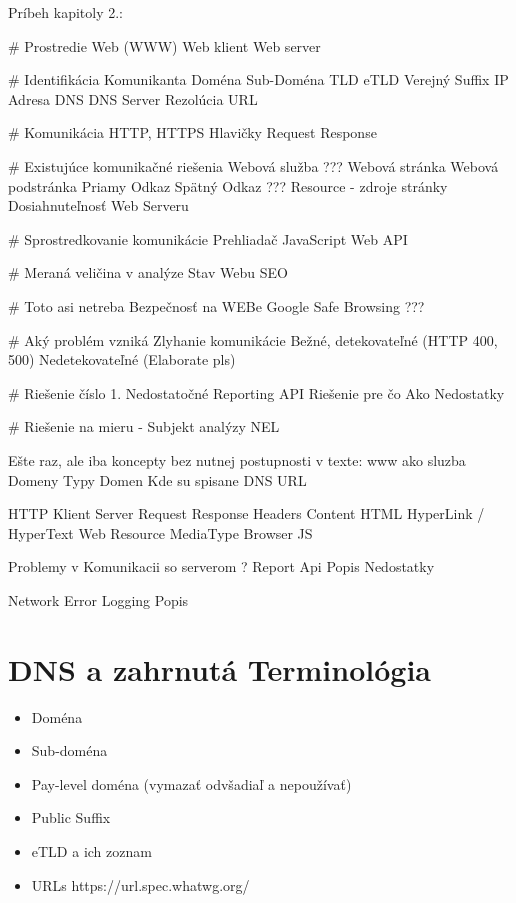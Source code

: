 Príbeh kapitoly 2.:

\# Prostredie
Web (WWW)
Web klient
Web server

\# Identifikácia Komunikanta
Doména
    Sub-Doména
TLD
eTLD
Verejný Suffix
IP Adresa
DNS
    DNS Server
    Rezolúcia
URL

\# Komunikácia
HTTP, HTTPS
Hlavičky
Request
Response

\# Existujúce komunikačné riešenia
Webová služba ???
Webová stránka
    Webová podstránka
    Priamy Odkaz
    Spätný Odkaz ???
    Resource - zdroje stránky
Dosiahnuteľnosť Web Serveru

\# Sprostredkovanie komunikácie
Prehliadač
    JavaScript
    Web API

\# Meraná veličina v analýze
Stav Webu
    SEO

\# Toto asi netreba
Bezpečnosť na WEBe
    Google Safe Browsing ???

\# Aký problém vzniká
Zlyhanie komunikácie
    Bežné, detekovateľné (HTTP 400, 500)
    Nedetekovateľné (Elaborate pls)

\# Riešenie číslo 1. Nedostatočné
Reporting API
    Riešenie pre čo 
    Ako
    Nedostatky

\# Riešenie na mieru - Subjekt analýzy    
NEL




Ešte raz, ale iba koncepty bez nutnej postupnosti v texte: 
www ako sluzba
    Domeny
        Typy Domen
        Kde su spisane
        DNS
        URL
    
HTTP
    Klient Server
    Request
    Response
    Headers
    Content
        HTML
        HyperLink / HyperText
        Web Resource
        MediaType
    Browser
        JS
    
Problemy v Komunikacii so serverom
    ?
    Report Api
        Popis
        Nedostatky

Network Error Logging
    Popis
    


\section{DNS a zahrnutá Terminológia}
\begin{itemize}
    \item Doména
    \item Sub-doména
    \item Pay-level doména (vymazať odvšadiaľ a nepoužívať)
    \item Public Suffix
    \item eTLD a ich zoznam
    \item URLs
    https://url.spec.whatwg.org/
\end{itemize}

